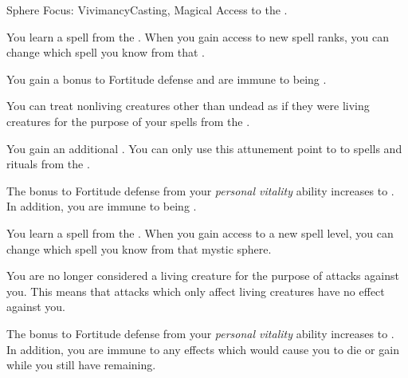     \begin{feat}{Sphere Focus: Vivimancy}{Casting, Magical}
        \featpre Access to the  .

         You learn a spell from the  .
        When you gain access to new spell ranks, you can change which spell you know from that .

         You gain a  bonus to Fortitude defense and are immune to being \sickened.

         You can treat nonliving creatures other than undead as if they were living creatures for the purpose of your spells from the  .

         You gain an additional .
        You can only use this attunement point to  to spells and rituals from the  .

         The bonus to Fortitude defense from your \textit{personal vitality} ability increases to .
        In addition, you are immune to being \nauseated.

         You learn a spell from the  .
        When you gain access to a new spell level, you can change which spell you know from that mystic sphere.

         You are no longer considered a living creature for the purpose of attacks against you.
        This means that attacks which only affect living creatures have no effect against you.

         The bonus to Fortitude defense from your \textit{personal vitality} ability increases to .
        In addition, you are immune to any effects which would cause you to die or gain  while you still have  remaining.
    \end{feat}

